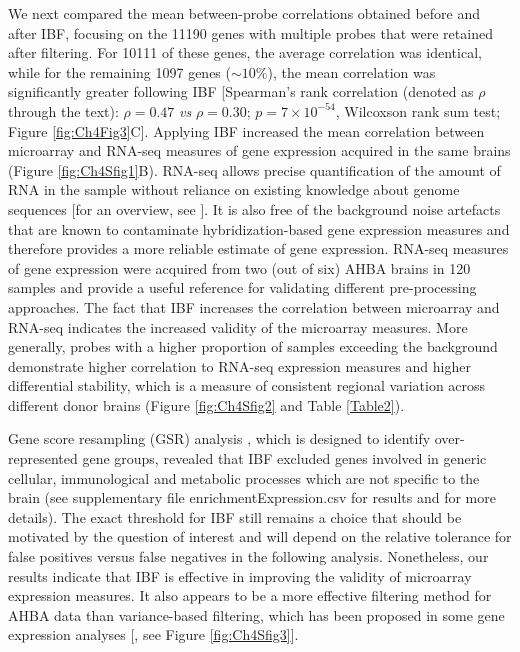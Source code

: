 \documentclass[10pt,A4]{article}
\begin{document}
We next compared the mean between-probe correlations obtained before and after IBF, focusing on the \num{11190} genes with multiple probes that were retained after filtering.
For \num{10111} of these genes, the average correlation was identical, while for the remaining \num{1097} genes ($\sim10\%$), the mean correlation was significantly greater following IBF [Spearman’s rank correlation (denoted as $\rho$ through the text): $\rho = 0.47$ \textit{vs} $\rho = 0.30$; $p = 7 \times 10^{-54}$, Wilcoxson rank sum test; Figure \ref{fig:Ch4Fig3}C]. Applying IBF increased the mean correlation between microarray and RNA-seq measures of gene expression acquired in the same brains (Figure \ref{fig:Ch4Sfig1}B). RNA-seq allows precise quantification of the amount of RNA in the sample without reliance on existing knowledge about genome sequences [for an overview, see \citet{Wang2009,Kukurba2015}]. It is also free of the background noise artefacts that are known to contaminate hybridization-based gene expression measures and therefore provides a more reliable estimate of gene expression. RNA-seq measures of gene expression were acquired from two (out of six) AHBA brains in 120 samples and provide a useful reference for validating different pre-processing approaches. The fact that IBF increases the correlation between microarray and RNA-seq indicates the increased validity of the microarray measures. More generally, probes with a higher proportion of samples exceeding the background demonstrate higher correlation to RNA-seq expression measures and higher differential stability, which is a measure of consistent regional variation across different donor brains (Figure \ref{fig:Ch4Sfig2} and Table \ref{Table2}).

Gene score resampling (GSR) analysis \citep{Gillis2010}, which is designed to identify over-represented gene groups, revealed that IBF excluded genes involved in generic cellular, immunological and metabolic processes which are not specific to the brain (see supplementary file enrichmentExpression.csv for results and  for more details). The exact threshold for IBF still remains a choice that should be motivated by the question of interest and will depend on the relative tolerance for false positives versus false negatives in the following analysis. Nonetheless, our results indicate that IBF is effective in improving the validity of microarray expression measures. It also appears to be a more effective filtering method for AHBA data than variance-based filtering, which has been proposed in some gene expression analyses [\citep{Hackstadt2009}, see Figure \ref{fig:Ch4Sfig3}].
\end{document}
